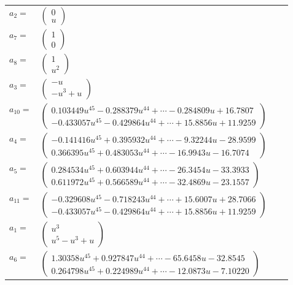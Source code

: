 \documentclass[1p]{elsarticle_modified}
\theoremstyle{definition}
\begin{document}
\begin{tabular}{m{7pt} m{180pt} m{7pt} m{180pt} }
\flushright $a_{2}=$&$\begin{pmatrix}0\\u\end{pmatrix}$ \\
\flushright $a_{7}=$&$\begin{pmatrix}1\\0\end{pmatrix}$ \\
\flushright $a_{8}=$&$\begin{pmatrix}1\\u^2\end{pmatrix}$ \\
\flushright $a_{3}=$&$\begin{pmatrix}- u\\- u^3+u\end{pmatrix}$ \\
\flushright $a_{10}=$&$\begin{pmatrix}0.103449 u^{45}-0.288379 u^{44}+\cdots-0.284809 u+16.7807\\-0.433057 u^{45}-0.429864 u^{44}+\cdots+15.8856 u+11.9259\end{pmatrix}$ \\
\flushright $a_{4}=$&$\begin{pmatrix}-0.141416 u^{45}+0.395932 u^{44}+\cdots-9.32244 u-28.9599\\0.366395 u^{45}+0.483053 u^{44}+\cdots-16.9943 u-16.7074\end{pmatrix}$ \\
\flushright $a_{5}=$&$\begin{pmatrix}0.284534 u^{45}+0.603944 u^{44}+\cdots-26.3454 u-33.3933\\0.611972 u^{45}+0.566589 u^{44}+\cdots-32.4869 u-23.1557\end{pmatrix}$ \\
\flushright $a_{11}=$&$\begin{pmatrix}-0.329608 u^{45}-0.718243 u^{44}+\cdots+15.6007 u+28.7066\\-0.433057 u^{45}-0.429864 u^{44}+\cdots+15.8856 u+11.9259\end{pmatrix}$ \\
\flushright $a_{1}=$&$\begin{pmatrix}u^3\\u^5- u^3+u\end{pmatrix}$ \\
\flushright $a_{6}=$&$\begin{pmatrix}1.30358 u^{45}+0.927847 u^{44}+\cdots-65.6458 u-32.8545\\0.264798 u^{45}+0.224989 u^{44}+\cdots-12.0873 u-7.10220\end{pmatrix}$ \\

\end{tabular}
\end{document}

